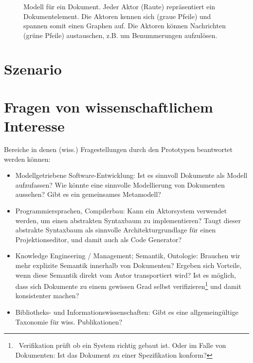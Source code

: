 \begin{figure}[h!]
\centering
\advance\leftskip-2.5cm
\caption{ Modell für ein Dokument. Jeder Aktor (Raute) repräsentiert ein Dokumentelement. Die Aktoren kennen sich (graue Pfeile) und spannen somit einen Graphen auf. Die Aktoren können Nachrichten (grüne Pfeile) austauschen, z.B. um Benummerungen aufzulösen. }\label{idee}
\end{figure}
 
\section{Szenario}\label{}
 
\section{Fragen von wissenschaftlichem Interesse}\label{wiss-fragen}
 
Bereiche in denen (wiss.) Fragestellungen durch den Prototypen beantwortet werden können:

 
\begin{itemize}

\item
Modellgetriebene Software-Entwicklung: Ist es sinnvoll Dokumente als Modell aufzufassen? Wie könnte eine sinnvolle Modellierung von Dokumenten aussehen? Gibt es ein gemeinsames Metamodell?


\item
Programmiersprachen, Compilerbau: Kann ein Aktorsystem verwendet werden, um einen abstrakten Syntaxbaum zu implementieren? Taugt dieser abstrakte Syntaxbaum als sinnvolle Architekturgrundlage für einen Projektionseditor, und damit auch als Code Generator?


\item
Knowledge Engineering / Management; Semantik, Ontologie: Brauchen wir mehr explizite Semantik innerhalb von Dokumenten? Ergeben sich Vorteile, wenn diese Semantik direkt vom Autor transportiert wird? Ist es möglich, dass sich Dokumente zu einem gewissen Grad selbst verifizieren\footnote{~Verifikation prüft ob ein System richtig gebaut ist. Oder im Falle von Dokumenten: Ist das Dokument zu einer Spezifikation konform?} und damit konsistenter machen?


\item
Bibliotheks- und Informationswissenschaften: Gibt es eine allgemeingültige Taxonomie für wiss. Publikationen?


\end{itemize}
 
